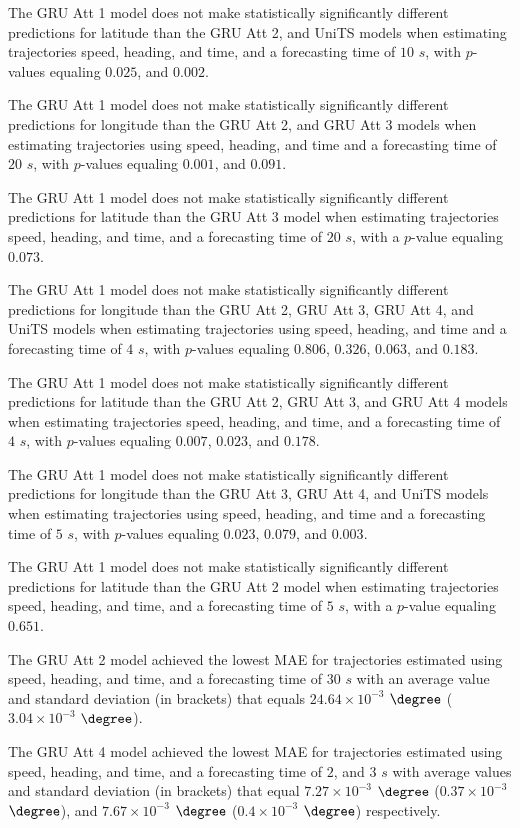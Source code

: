 The GRU Att 1 model does not make statistically significantly different predictions for latitude than the GRU Att 2, and UniTS models when estimating trajectories speed, heading, and time, and a forecasting time of $10$ $s$, with $p$-values equaling $0.025$, and $0.002$.

The GRU Att 1 model does not make statistically significantly different predictions for longitude than the GRU Att 2, and GRU Att 3 models when estimating trajectories using speed, heading, and time and a forecasting time of $20$ $s$, with $p$-values equaling $0.001$, and $0.091$.

The GRU Att 1 model does not make statistically significantly different predictions for latitude than the GRU Att 3 model when estimating trajectories speed, heading, and time, and a forecasting time of $20$ $s$, with a $p$-value equaling $0.073$.

The GRU Att 1 model does not make statistically significantly different predictions for longitude than the GRU Att 2, GRU Att 3, GRU Att 4, and UniTS models when estimating trajectories using speed, heading, and time and a forecasting time of $4$ $s$, with $p$-values equaling $0.806$, $0.326$, $0.063$, and $0.183$.

The GRU Att 1 model does not make statistically significantly different predictions for latitude than the GRU Att 2, GRU Att 3, and GRU Att 4 models when estimating trajectories speed, heading, and time, and a forecasting time of $4$ $s$, with $p$-values equaling $0.007$, $0.023$, and $0.178$.

The GRU Att 1 model does not make statistically significantly different predictions for longitude than the GRU Att 3, GRU Att 4, and UniTS models when estimating trajectories using speed, heading, and time and a forecasting time of $5$ $s$, with $p$-values equaling $0.023$, $0.079$, and $0.003$.

The GRU Att 1 model does not make statistically significantly different predictions for latitude than the GRU Att 2 model when estimating trajectories speed, heading, and time, and a forecasting time of $5$ $s$, with a $p$-value equaling $0.651$.

The GRU Att 2 model achieved the lowest MAE for trajectories estimated using speed, heading, and time, and a forecasting time of $30$ $s$ with an average value and standard deviation (in brackets) that equals $24.64 \times 10^{-3}$ $\degree$ ($3.04 \times 10^{-3}$ $\degree$).

The GRU Att 4 model achieved the lowest MAE for trajectories estimated using speed, heading, and time, and a forecasting time of $2$, and $3$ $s$ with average values and standard deviation (in brackets) that equal $7.27 \times 10^{-3}$ $\degree$ ($0.37 \times 10^{-3}$ $\degree$), and $7.67 \times 10^{-3}$ $\degree$ ($0.4 \times 10^{-3}$ $\degree$) respectively.


